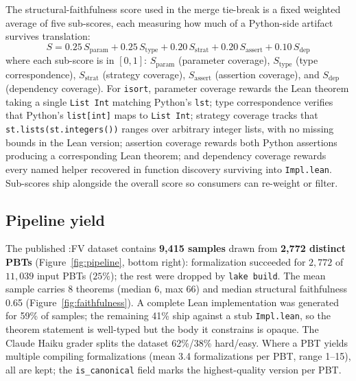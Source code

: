 The structural-faithfulness score used in the merge
tie-break is a fixed weighted average of five sub-scores, each measuring
how much of a Python-side artifact survives translation:
\begin{equation}
  S = 0.25\,S_{\text{param}} + 0.25\,S_{\text{type}} + 0.20\,S_{\text{strat}} + 0.20\,S_{\text{assert}} + 0.10\,S_{\text{dep}}
  \label{eq:faithfulness}
\end{equation}
where each sub-score is in $[0,1]$: $S_{\text{param}}$ (parameter coverage), $S_{\text{type}}$ (type correspondence), $S_{\text{strat}}$ (strategy coverage), $S_{\text{assert}}$ (assertion coverage), and $S_{\text{dep}}$ (dependency coverage). For
\texttt{isort}, parameter coverage rewards the Lean theorem taking a
single \texttt{List Int} matching Python's \texttt{lst}; type
correspondence verifies that Python's \texttt{list[int]} maps to
\texttt{List Int}; strategy coverage tracks that
\texttt{st.lists(st.integers())} ranges over arbitrary integer lists,
with no missing bounds in the Lean version; assertion coverage rewards
both Python assertions producing a corresponding Lean theorem; and
dependency coverage rewards every named helper recovered in function
discovery surviving into \texttt{Impl.lean}. Sub-scores ship alongside
the overall score so consumers can re-weight or filter.

\subsection{Pipeline yield}
\label{sec:pipeline-yield}

The published \FVSpec:FV dataset contains
\textbf{9{,}415 samples} drawn from \textbf{2{,}772 distinct PBTs}
(Figure~\ref{fig:pipeline}, bottom right):
formalization succeeded for $2{,}772$ of $11{,}039$ input PBTs ($25\%$);
the rest were dropped by \texttt{lake build}. The mean sample carries 8 theorems
(median 6, max 66) and median structural faithfulness 0.65 (Figure~\ref{fig:faithfulness}). A complete Lean implementation was generated for 59\% of samples; the remaining 41\% ship
against a stub \texttt{Impl.lean}, so the theorem statement is well-typed
but the body it constrains is opaque. The Claude Haiku grader splits the
dataset 62\%/38\% hard/easy. Where a PBT yields multiple compiling
formalizations (mean 3.4 formalizations per PBT, range 1--15), all are kept; the
\texttt{is\_canonical} field marks the highest-quality version per PBT.

